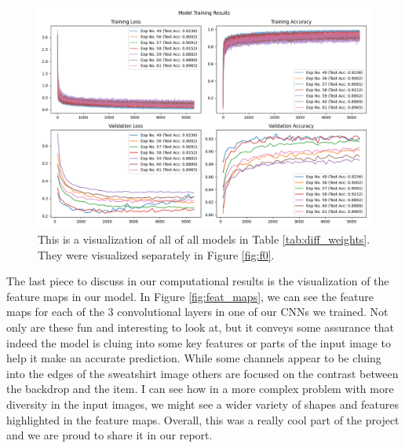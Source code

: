 \documentclass[11pt]{amsart}
\begin{document}
\begin{figure}[h]
	\centering
	\includegraphics[width=.6\textwidth]{../visualizations/model_training_results_vis_1.png}
\caption{This is a visualization of all of all models in Table \ref{tab:diff_weights}.
	They were visualized separately in Figure \ref{fig:f0}.}
    \label{fig:f1}
\end{figure}

The last piece to discuss in our computational results is the visualization of the feature maps in our model.
In Figure \ref{fig:feat_maps}, we can see the feature maps for each of the 3 convolutional layers in one of our CNNs we trained.
Not only are these fun and interesting to look at, but it conveys some assurance that indeed the model is cluing into some key features or parts of the input image to help it make an accurate prediction.
While some channels appear to be cluing into the edges of the sweatshirt image others are focused on the contrast between the backdrop and the item.
I can see how in a more complex problem with more diversity in the input images, we might see a wider variety of shapes and features highlighted in the feature maps.
Overall, this was a really cool part of the project and we are proud to share it in our report.
\end{document}
